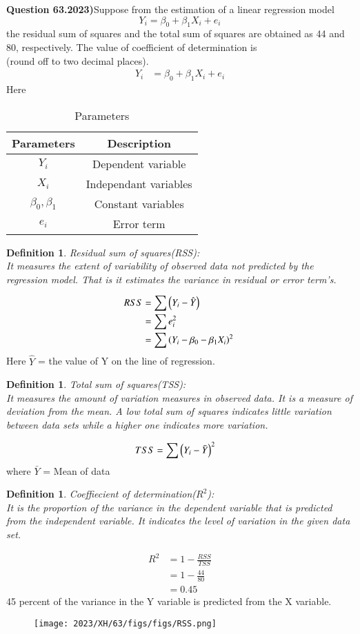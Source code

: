 \documentclass[journal,12pt,twocolumn]{IEEEtran}
\newtheorem{definition}[problem]{Definition}
\theoremstyle{remark}
\begin{document}
\textbf{Question 63.2023)}Suppose from the estimation of a linear regression model
$$Y_i=\beta_0+\beta_1X_i+e_i$$
the residual sum of squares and the total sum of squares are obtained as 44 and 80, respectively. The value of coefficient of determination is \\ (round off to two decimal places).\\
\solution
\fi
\begin{align}
Y_i &= \beta_0+\beta_1X_i+e_i
\end{align}
Here 
\begin{table}[ht]
    \centering
    \caption{Parameters}
    \label{table:xh_63.2023}
\begin{tabular}{|c|c|}
\hline
Parameters & Description \\
\hline
$Y_i$ & Dependent variable \\
\hline
$X_i$ & Independant variables \\
\hline
$\beta_0 , \beta_1$ & Constant variables \\ 
\hline
$e_i$ & Error term \\
\hline
\end{tabular} 
\end{table}
\begin{definition}
Residual sum of squares(RSS): \\
It measures the extent of variability of observed data not predicted by the regression model. That is it estimates the variance in residual or error term's. 
\end{definition}
\begin{align}
RSS &= \sum \left(Y_i-\hat{Y}\right) \\
    &= \sum e_i^2 \\
    &= \sum \left(Y_i-\beta_0-\beta_1X_i\right)^2\
\end{align}
Here $\hat{Y}$ = the value of Y on the line of regression.
\begin{definition}
Total sum of squares(TSS): \\
It measures the amount of variation measures in observed data. It is a measure of deviation from the mean. A low total sum of squares indicates little variation between data sets while a higher one indicates more variation. 
\end{definition}
\begin{align}
TSS &= \sum \left(Y_i-\bar{Y}\right)^2
\end{align}
where $\bar{Y}$ = Mean of data
\begin{definition}
Coeffiecient of determination(\(R^2\)):\\
It is the proportion of the variance in the dependent variable that is predicted from the independent variable. It indicates the level of variation in the given data set.
\end{definition}
\begin{align}
R^2 &= 1-\frac{RSS}{TSS}\\
&= 1-\frac{44}{80}\\
&=0.45
\end{align}
45 percent of the variance in the Y variable is predicted from the X variable.
\begin{figure}[!ht]
\centering
\texttt{[image: 2023/XH/63/figs/figs/RSS.png]}
\label{fig:xh_63.2023}
\end{figure}
\end{document}
